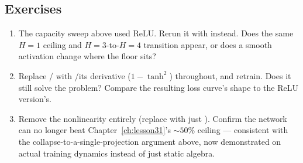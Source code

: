 \subsection*{Exercises}
\begin{enumerate}
  \item The capacity sweep above used ReLU. Rerun it with  instead. Does the same $H=1$ ceiling and $H=3$-to-$H=4$ transition appear, or does a smooth activation change where the floor sits?
  \item Replace / with /its derivative ($1-\tanh^2$) throughout, and retrain. Does it still solve the problem? Compare the resulting loss curve's shape to the ReLU version's.
  \item Remove the nonlinearity entirely (replace  with just ). Confirm the network can no longer beat Chapter~\ref{ch:lesson31}'s $\sim50\%$ ceiling --- consistent with the collapse-to-a-single-projection argument above, now demonstrated on actual training dynamics instead of just static algebra.
\end{enumerate}

\vfill
{}
